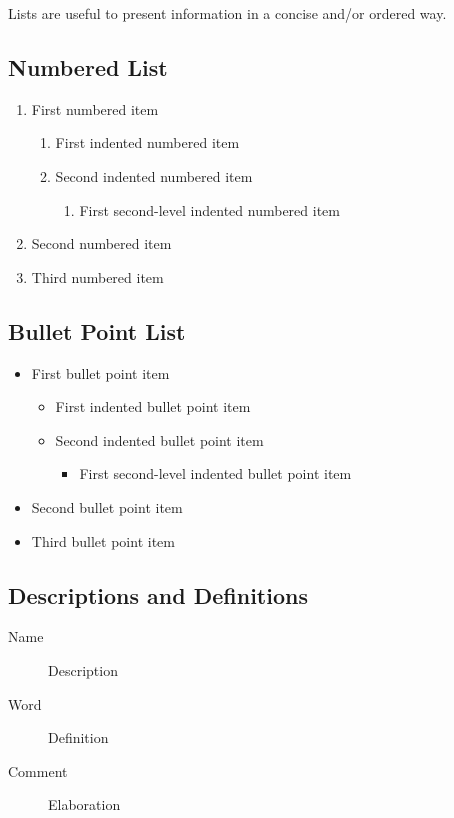 \documentclass[
	11pt, %
	fleqn, %
	letterpaper, %
]{CommodoreBlueBook}
\begin{document}
Lists are useful to present information in a concise and/or ordered way.

\subsection{Numbered List}

\begin{enumerate}
	\item First numbered item
	\begin{enumerate}
		\item First indented numbered item
		\item Second indented numbered item
		\begin{enumerate}
			\item First second-level indented numbered item
		\end{enumerate}
	\end{enumerate}
	\item Second numbered item
	\item Third numbered item
\end{enumerate}

\subsection{Bullet Point List}

\begin{itemize}
	\item First bullet point item
	\begin{itemize}
		\item First indented bullet point item
		\item Second indented bullet point item
		\begin{itemize}
			\item First second-level indented bullet point item
		\end{itemize}
	\end{itemize}
	\item Second bullet point item
	\item Third bullet point item
\end{itemize}

\subsection{Descriptions and Definitions}

\begin{description}
	\item[Name] Description
	\item[Word] Definition
	\item[Comment] Elaboration
\end{description}
\end{document}
